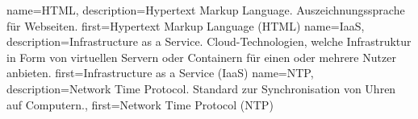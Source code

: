 {%
    name={HTML},
    description={Hypertext Markup Language. Auszeichnungssprache für
    Webseiten.}
    first={Hypertext Markup Language (HTML)}
}
{%
    name={IaaS},
    description={Infrastructure as a Service. Cloud-Technologien,
    welche Infrastruktur in Form von virtuellen Servern oder Containern für
    einen oder mehrere Nutzer anbieten.}
    first={Infrastructure as a Service (IaaS)}
}
{%
    name={NTP},
    description={Network Time Protocol. Standard zur Synchronisation von Uhren auf Computern.},
    first={Network Time Protocol (NTP)}
}
